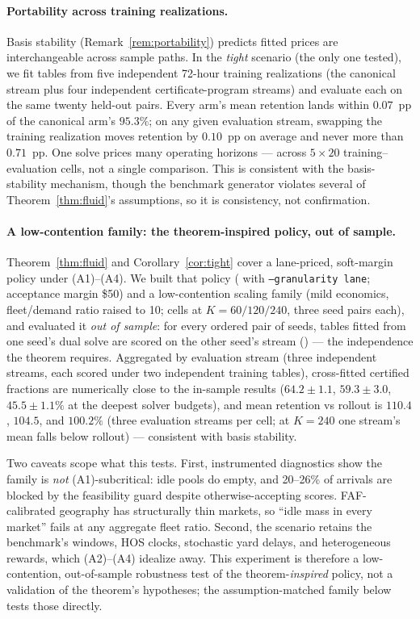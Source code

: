 \documentclass[11pt]{article}
\begin{document}
\paragraph{Portability across training realizations.} Basis
stability (Remark~\ref{rem:portability}) predicts fitted prices are
interchangeable across sample paths. In the \emph{tight} scenario
(the only one tested), we fit tables from five
independent 72-hour training realizations (the canonical stream plus
four independent certificate-program streams) and evaluate each on the
same twenty held-out pairs. Every arm's mean retention lands within
$0.07$~pp of the canonical arm's $95.3\%$; on any given evaluation
stream, swapping the training realization moves retention by
$0.10$~pp on average and never more than $0.71$~pp. One solve prices
many operating horizons --- across $5 \times 20$
training--evaluation cells, not a single comparison. This is
consistent with the basis-stability mechanism, though the benchmark
generator violates several of Theorem~\ref{thm:fluid}'s assumptions,
so it is consistency, not confirmation.

\paragraph{A low-contention family: the theorem-inspired policy, out
of sample.} Theorem~\ref{thm:fluid}
and Corollary~\ref{cor:tight} cover a lane-priced, soft-margin policy
under (A1)--(A4). We built that policy
( with \texttt{--granularity lane};
acceptance margin \$50) and a low-contention scaling family (mild
economics, fleet/demand
ratio raised to 10; cells at $K = 60/120/240$, three seed pairs each),
and evaluated it \emph{out of sample}: for every ordered pair of
seeds, tables fitted from one seed's dual solve are scored on the
other seed's stream () ---
the independence the theorem requires. Aggregated by evaluation
stream (three independent streams, each scored under two independent
training tables), cross-fitted certified fractions are numerically
close to the in-sample results
($64.2 \pm 1.1$, $59.3 \pm 3.0$, $45.5 \pm 1.1\%$ at the deepest
solver budgets), and mean retention vs rollout is $110.4$, $104.5$,
and $100.2\%$ (three evaluation streams per cell; at $K = 240$ one
stream's mean falls below rollout) --- consistent with basis
stability.

Two caveats scope what this tests. First, instrumented diagnostics
show the family is \emph{not} (A1)-subcritical: idle pools do empty,
and 20--26\% of arrivals are blocked by the feasibility guard despite
otherwise-accepting scores. FAF-calibrated geography has structurally
thin markets, so ``idle mass in every market'' fails at any aggregate
fleet ratio. Second, the scenario retains the benchmark's windows,
HOS clocks, stochastic yard delays, and heterogeneous rewards, which
(A2)--(A4) idealize away. This experiment is therefore a
low-contention, out-of-sample robustness test of the
theorem-\emph{inspired} policy, not a validation of the theorem's
hypotheses; the assumption-matched family below tests those
directly.
\end{document}
